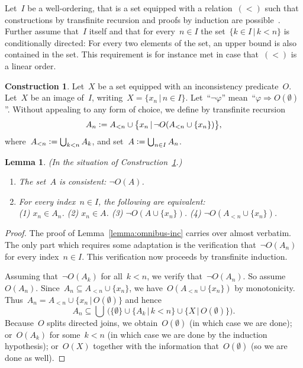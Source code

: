\documentclass[com,11pt,crcready]{iosart2x}
\theoremstyle{definition}
\newtheorem{construction}{Construction}[section]
\theoremstyle{plain}
\newtheorem{lemma}[definition]{Lemma}
\theoremstyle{remark}
\newcommand{\defeq}{\vcentcolon=}
\renewcommand{\_}{\mathpunct{.}\,}
\begin{document}
Let~$I$ be a well-ordering, that is a set equipped with a relation~$({<})$ such
that constructions by transfinite recursion and proofs by induction are
possible~\cite{XXX}. Further assume that~$I$ itself and that for every~$n \in
I$ the set~$\{ k \in I \,|\, k < n \}$ is conditionally directed: For every two
elements of the set, an upper bound is also contained in the set. This
requirement is for instance met in case that~$({<})$ is a linear order.

\begin{construction}\label{constr:inc-wf}Let~$X$ be a set equipped with
an inconsistency predicate~$O$. Let~$X$ be an image of~$I$, writing~$X = \{ x_n
\,|\, n \in I \}$. Let~``$\neg\varphi$'' mean~``$\varphi \Rightarrow
O(\emptyset)$''. Without appealing to any form of choice, we define by
transfinite recursion
\[ A_n \defeq A_{<n} \cup \bigl\{ x_n \,|\, \neg O(A_{<n}\cup\{x_n\}) \bigr\}, \]
where~$A_{<n} \defeq \bigcup_{k < n} A_k$, and set~$A \defeq \bigcup_{n \in I} A_n$.
\end{construction}

\begin{lemma}\label{lemma:omnibus-inc-wf}(In the situation of
Construction~\ref{constr:inc-wf}.)
\begin{enumerate}
\item[(a)] The set~$A$ is consistent: $\neg O(A)$.
\item[(b)] For every index~$n \in I$, the following are equivalent: \\
(1) $x_n \in A_n$. \quad
(2) $x_n \in A$. \quad
(3) $\neg O(A\cup\{x_n\})$. \quad
(4) $\neg O(A_{<n} \cup \{x_n\})$.
\end{enumerate}\end{lemma}

\begin{proof}The proof of Lemma~\ref{lemma:omnibus-inc} carries over almost
verbatim. The only part which requires some adaptation is the verification
that~$\neg O(A_n)$ for every index~$n \in I$. This verification now proceeds by
transfinite induction.

Assuming that~$\neg O(A_k)$ for all~$k < n$, we verify that~$\neg O(A_n)$. So
assume~$O(A_n)$. Since~$A_n \subseteq A_{<n} \cup \{x_n\}$, we have~$O(A_{<n}
\cup \{x_n\})$ by monotonicity. Thus~$A_n = A_{<n} \cup
\{x_n\,|\,O(\emptyset)\}$ and hence
\[ A_n \subseteq \bigcup\,\bigl(\{ \emptyset \} \cup \{ A_k \,|\, k < n \} \cup
\{ X \,|\, O(\emptyset) \}\bigr). \]
Because~$O$ splits directed joins, we obtain~$O(\emptyset)$ (in which case we
are done); or~$O(A_k)$ for some~$k < n$ (in which case we are done by the
induction hypothesis); or~$O(X)$ together with the information
that~$O(\emptyset)$ (so we are done as well).
\end{proof}
\end{document}
